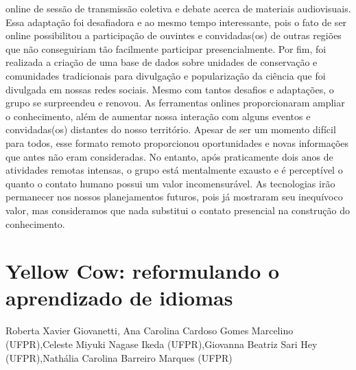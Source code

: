 online de sessão de transmissão coletiva e debate acerca de materiais audiovisuais. Essa
adaptação foi desafiadora e ao mesmo tempo interessante, pois o fato de ser online possibilitou a
participação de ouvintes e convidadas(os) de outras regiões que não conseguiriam tão facilmente
participar presencialmente.
Por fim, foi realizada a criação de uma base de dados sobre unidades de conservação e
comunidades tradicionais para divulgação e popularização da ciência que foi divulgada em
nossas redes sociais.
Mesmo com tantos desafios e adaptações, o grupo se surpreendeu e renovou. As
ferramentas onlines proporcionaram ampliar o conhecimento, além de aumentar nossa interação
com alguns eventos e convidadas(os) distantes do nosso território. Apesar de ser um momento
difícil para todos, esse formato remoto proporcionou oportunidades e novas informações que
antes não eram consideradas. No entanto, após praticamente dois anos de atividades remotas
intensas, o grupo está mentalmente exausto e é perceptível o quanto o contato humano possui um
valor incomensurável. As tecnologias irão permanecer nos nossos planejamentos futuros, pois já
mostraram seu inequívoco valor, mas consideramos que nada substitui o contato presencial na
construção do conhecimento.



\section{Yellow Cow: reformulando o aprendizado de idiomas}

Roberta Xavier Giovanetti, Ana Carolina Cardoso Gomes Marcelino (UFPR),Celeste Miyuki Nagase Ikeda (UFPR),Giovanna Beatriz Sari Hey (UFPR),Nathália Carolina Barreiro Marques (UFPR)

